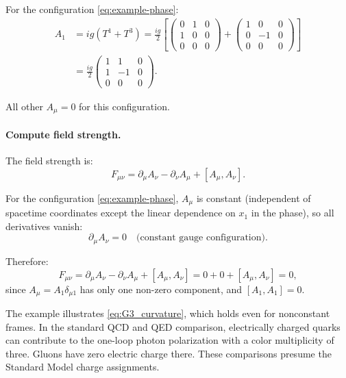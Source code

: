 For the configuration \eqref{eq:example-phase}:
\begin{align}
A_1 &= i g (T^1 + T^3) = \frac{ig}{2} \left[\begin{pmatrix} 0 & 1 & 0 \\ 1 & 0 & 0 \\ 0 & 0 & 0 \end{pmatrix} + \begin{pmatrix} 1 & 0 & 0 \\ 0 & -1 & 0 \\ 0 & 0 & 0 \end{pmatrix}\right] \nonumber \\
&= \frac{ig}{2} \begin{pmatrix} 1 & 1 & 0 \\ 1 & -1 & 0 \\ 0 & 0 & 0 \end{pmatrix}.
\label{eq:A1-example}
\end{align}

All other $A_\mu = 0$ for this configuration.

\paragraph{Compute field strength.} The field strength is:
\begin{equation}
F_{\mu\nu} = \partial_\mu A_\nu - \partial_\nu A_\mu + [A_\mu, A_\nu].
\label{eq:F-example}
\end{equation}

For the configuration \eqref{eq:example-phase}, $A_\mu$ is constant (independent of spacetime coordinates except the linear dependence on $x_1$ in the phase), so all derivatives vanish:
\begin{equation}
\partial_\mu A_\nu = 0 \quad \text{(constant gauge configuration)}.
\label{eq:derivatives-zero}
\end{equation}

Therefore:
\begin{equation}
F_{\mu\nu} = \partial_\mu A_\nu - \partial_\nu A_\mu + [A_\mu, A_\nu] = 0 + 0 + [A_\mu, A_\nu] = 0,
\label{eq:F-vanishes}
\end{equation}
since $A_\mu = A_1 \delta_{\mu 1}$ has only one non-zero component, and $[A_1, A_1] = 0$.

The example illustrates \eqref{eq:G3_curvature}, which holds even for
nonconstant frames. In the standard QCD and QED comparison, electrically
charged quarks can contribute to the one-loop photon polarization with a
color multiplicity of three. Gluons have zero electric charge there. These
comparisons presume the Standard Model charge assignments.

